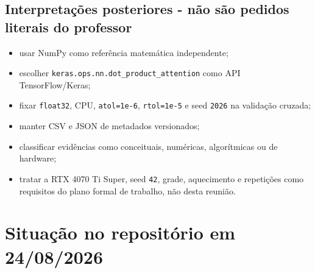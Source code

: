 \subsection{Interpretações posteriores - não são pedidos literais do professor}


\begin{itemize}
\item usar NumPy como referência matemática independente;
\item escolher \texttt{keras.\allowbreak{}ops.\allowbreak{}nn.\allowbreak{}dot\_\allowbreak{}product\_\allowbreak{}attention} como API TensorFlow/Keras;
\item fixar \texttt{float32}, CPU, \texttt{atol=1e-6}, \texttt{rtol=1e-5} e seed \texttt{2026} na validação
cruzada;
\item manter CSV e JSON de metadados versionados;
\item classificar evidências como conceituais, numéricas, algorítmicas ou de
hardware;
\item tratar a RTX 4070 Ti Super, seed \texttt{42}, grade, aquecimento e repetições como
requisitos do plano formal de trabalho, não desta reunião.
\end{itemize}


\section{Situação no repositório em 24/08/2026}



